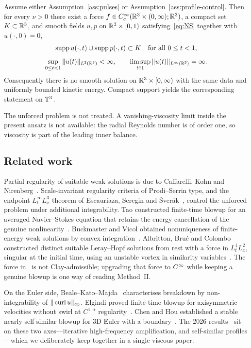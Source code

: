 \begin{theorem}
\label{thm:conditional}
Assume either Assumption~\ref{ass:pulses} or Assumption~\ref{ass:profile-control}. Then for every $\nu>0$ there exist a force $f\in C_c^\infty(\mathbb{R}^3\times(0,\infty);\mathbb{R}^3)$, a compact set $K\subset\mathbb{R}^3$, and smooth fields $u,p$ on $\mathbb{R}^3\times[0,1)$ satisfying~\eqref{eq:NS} together with $u(\cdot,0)=0$,
\[
\operatorname{supp} u(\cdot,t)\cup\operatorname{supp} p(\cdot,t)\subset K
\quad\text{for all }0\le t<1,
\]
\[
\sup_{0\le t<1}\|u(t)\|_{L^2(\mathbb{R}^3)}<\infty,
\qquad
\limsup_{t\uparrow 1}\|u(t)\|_{L^\infty(\mathbb{R}^3)}=\infty.
\]
Consequently there is no smooth solution on $\mathbb{R}^3\times[0,\infty)$ with the same data and uniformly bounded kinetic energy. Compact support yields the corresponding statement on $\mathbb{T}^3$.
\end{theorem}

The unforced problem is not treated. A vanishing-viscosity limit inside the present ansatz is not available: the radial {R}eynolds number is of order one, so viscosity is part of the leading inner balance.

\subsection{Related work}
\label{sec:intro-related}

Partial regularity of suitable weak solutions is due to {C}affarelli, {K}ohn and {N}irenberg~\cite{ckn1982}. Scale-invariant regularity criteria of {P}rodi--{S}errin type, and the endpoint $L^\infty_t L^3_x$ theorem of {E}scauriaza, {S}eregin and {\v{S}}ver{\'a}k~\cite{ess2003}, control the unforced problem under additional integrability. {T}ao constructed finite-time blowup for an averaged {N}avier--{S}tokes equation that retains the energy cancellation of the genuine nonlinearity~\cite{tao2016}. {B}uckmaster and {V}icol obtained nonuniqueness of finite-energy weak solutions by convex integration~\cite{buckmastervicol2019}. {A}lbritton, {B}ru{\'e} and {C}olombo constructed distinct suitable {L}eray--{H}opf solutions from rest with a force in $L^1_t L^2_x$, singular at the initial time, using an unstable vortex in similarity variables~\cite{abc2022}. The force in~\cite{abc2022} is not {C}lay-admissible; upgrading that force to $C^\infty$ while keeping a genuine blowup is one way of reading Method~II.

On the {E}uler side, {B}eale--{K}ato--{M}ajda~\cite{bkm1984} characterises breakdown by non-integrability of $\|\operatorname{curl} u\|_\infty$. {E}lgindi proved finite-time blowup for axisymmetric velocities without swirl at $C^{1,\alpha}$ regularity~\cite{elgindi2021}. {C}hen and {H}ou established a stable nearly self-similar blowup for $3$D {E}uler with a boundary~\cite{chenhou2022}. The 2026 results~\cite{openai2026euler,alpoegbuckmaster2026,anandkumar2026} sit on these two axes---iterative high-frequency amplification, and self-similar profiles---which we deliberately keep together in a single viscous paper.


